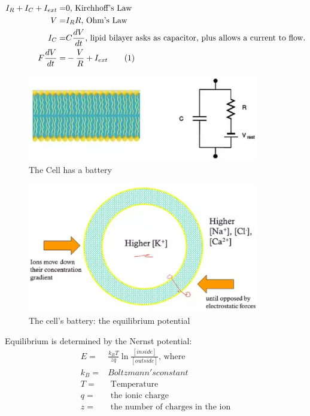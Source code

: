 \documentclass[]{article}
\newcommand\numberthis{\addtocounter{equation}{1}\tag{\theequation}}
\begin{document}
\begin{align*}
	I_R + I_C + I_{ext} =& 0 \text{, Kirchhoff's Law}\\
	V =& I_R R \text{, Ohm's Law}\\
	I_C =& C \frac{dV}{dt} \text{, lipid bilayer asks as capacitor, plus allows a current to flow.}\\
	F\frac{dV}{dt} =& -\frac{V}{R} + I_{ext} \numberthis \label{eq:1st:neuron:eq}
\end{align*}

\begin{figure}[H]
	\caption[The Cell has a battery]{The Cell has a battery}
	\includegraphics[width=0.9\textwidth]{cell-has-battery}
\end{figure}

\begin{figure}[H]
	\caption[The cell's battery: the equilibrium potential]{The cell's battery: the equilibrium potential}
	\includegraphics[width=0.9\textwidth]{equilibrium-potential}
\end{figure}

Equilibrium is determined by the Nernst potential\cite{enwiki:1121504046}:
\begin{align*}
	E =& \frac{k_B T}{zq}\ln \frac{[inside]}{[outside]} \text{, where}\\
	k_B=& Boltzmann's constant\\
	T=& \text{ Temperature}\\
	q=& \text{ the ionic charge}\\
	z=&	\text{ the number of charges in the ion}
\end{align*}
\end{document}
